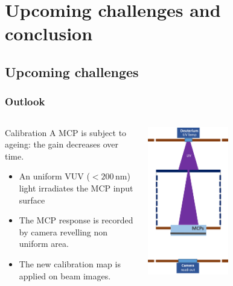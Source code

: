 \section{Upcoming challenges and conclusion}
\subsection{Upcoming challenges}
\begin{frame}[t]
  \frametitle{Outlook}
  \begin{columns}[T]
    \begin{column}{0.45\textwidth}
      \begin{block}{Calibration}
        A MCP is subject to ageing: the gain decreases over time.
        \begin{itemize}
          \item An uniform VUV ($<200\,\mathrm{nm}$) light irradiates the MCP input surface
          \item The MCP response is recorded by camera revelling non uniform area.
          \item The new calibration map is applied on beam images.
        \end{itemize}
      \end{block}
    \end{column}
    \begin{column}{0.45\textwidth}
      \begin{center}
        \includegraphics[width=0.5\textwidth]{05_Conclusion/fig/fig000_UV_calib}

\end{center}
\end{column}
\end{columns}
\end{frame}
